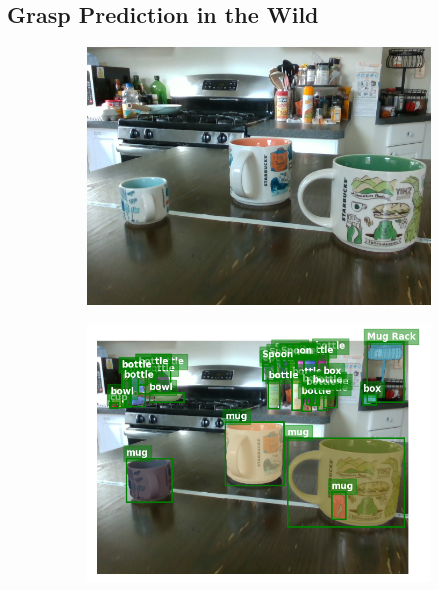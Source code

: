 \documentclass{article}
\begin{document}
\subsection{Grasp Prediction in the Wild}
\label{sec:exp:wild}

\begin{figure}[]
    \centering

    \begin{subfigure}{(\linewidth - 0.05\linewidth)/5}
        \centering
        \includegraphics[width=\linewidth]{figures/real2sim2real/2/1.png}
    \end{subfigure}
    \begin{subfigure}{(\linewidth - 0.05\linewidth)/5}
        \centering
        \includegraphics[width=\linewidth]{figures/real2sim2real/2/0.png}

\end{subfigure}
\end{figure}
\end{document}
